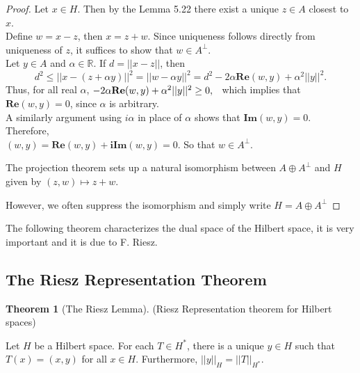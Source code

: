 \documentclass[11pt,a4paper]{article}
\theoremstyle{definition}
\newtheorem{thm}{Theorem}[section]
\begin{document}
\begin{proof}
Let $x\in H$. Then by the Lemma 5.22 there exist a unique $z\in A$ closest to $x$.\\ Define $w=x-z$, then $x=z+w$. Since uniqueness follows directly from uniqueness of $z$, it suffices to show that $w\in A^{\perp}$.\\ Let $y\in A$ and $\alpha \in \mathbb{R}$. If $d=||x-z||$, then $$d^2\leq ||x-(z+\alpha y)||^2=||w-\alpha y||^2=d^2-2\alpha \textbf{Re}(w,y)+\alpha^2||y||^2.$$ Thus, for all real $\alpha$, \hspace{0.2cm}$-2\alpha \textbf{Re}(w,y)+\alpha^2||y||^2\geq 0,\hspace{0.2cm}$ which implies that $\textbf{Re}(w,y)=0$, since $\alpha$ is arbitrary. \\
A similarly argument using $i\alpha$ in place of $\alpha$ shows that $\textbf{Im}(w,y)=0$. Therefore,\\$(w,y)=\textbf{Re}(w,y)+\textbf{iIm}(w,y)=0.$ So that $w\in A^{\perp}$.


The projection theorem sets up a natural isomorphism between $A\oplus A^{\perp}$ and $H$ given by $(z,w)\longmapsto z+w$.


However, we often suppress the isomorphism and simply write \hspace{0.2cm}$H=A\oplus A^{\perp}$


\end{proof}
The following theorem characterizes the dual space of the Hilbert space, it is very important and  it is due to F. Riesz.


\subsection{The Riesz Representation Theorem}

\begin{thm}[The Riesz Lemma]
(Riesz Representation theorem for Hilbert spaces)

Let $H$ be a Hilbert space. For each $T\in H^*$, there is a unique $y\in H$ such that $T(x)=(x,y)$ for all $x\in H$. Furthermore, $||y||_H=||T||_{H^*}$.

\end{thm}
\end{document}
